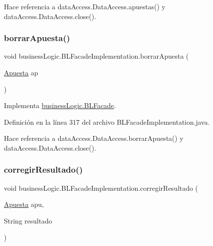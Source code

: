 Hace referencia a data\+Access.\+Data\+Access.\+apuestas() y data\+Access.\+Data\+Access.\+close().

\mbox{\label{classbusinessLogic_1_1BLFacadeImplementation_a3abfaef4d8952fca7a22d4b346fb155a}} 
\subsubsection{\texorpdfstring{borrarApuesta()}{borrarApuesta()}}
{\footnotesize\ttfamily void business\+Logic.\+B\+L\+Facade\+Implementation.\+borrar\+Apuesta (\begin{DoxyParamCaption}\item[{\mbox{\hyperlink{classdomain_1_1Apuesta}{Apuesta}}}]{ap }\end{DoxyParamCaption})}



Implementa \mbox{\hyperlink{interfacebusinessLogic_1_1BLFacade_ab30f9458b5169fda3e5bead92dcf3f84}{business\+Logic.\+B\+L\+Facade}}.



Definición en la línea 317 del archivo B\+L\+Facade\+Implementation.\+java.


\begin{DoxyCode}{0}

\end{DoxyCode}


Hace referencia a data\+Access.\+Data\+Access.\+borrar\+Apuesta() y data\+Access.\+Data\+Access.\+close().

\mbox{\label{classbusinessLogic_1_1BLFacadeImplementation_a46e307bd8d9e04795bd15b815220d782}} 
\subsubsection{\texorpdfstring{corregirResultado()}{corregirResultado()}}
{\footnotesize\ttfamily void business\+Logic.\+B\+L\+Facade\+Implementation.\+corregir\+Resultado (\begin{DoxyParamCaption}\item[{\mbox{\hyperlink{classdomain_1_1Apuesta}{Apuesta}}}]{apu,  }\item[{String}]{resultado }\end{DoxyParamCaption})}



